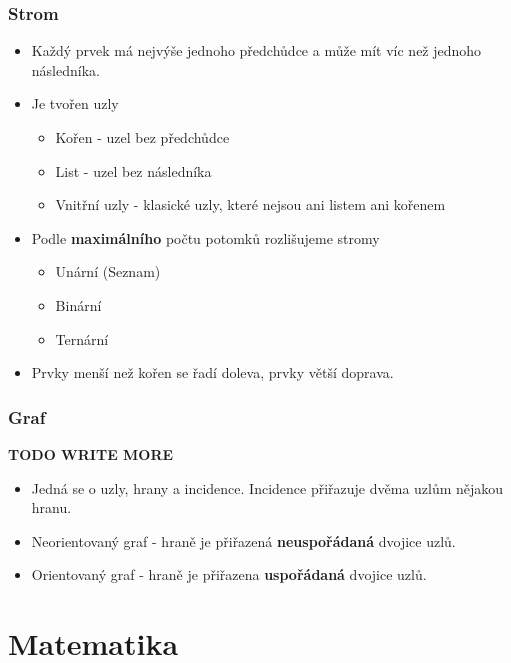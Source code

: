 \documentclass[10pt,a4paper]{article}
\begin{document}
\subsubsection{Strom}
\begin{itemize}
\item Každý prvek má nejvýše jednoho předchůdce a může mít víc než jednoho následníka.
\item Je tvořen uzly
\begin{itemize}
\item Kořen - uzel bez předchůdce
\item List - uzel bez následníka
\item Vnitřní uzly - klasické uzly, které nejsou ani listem ani kořenem
\end{itemize}
\item Podle \textbf{maximálního} počtu potomků rozlišujeme stromy
\begin{itemize}
\item Unární (Seznam)
\item Binární
\item Ternární
\end{itemize}
\item Prvky menší než kořen se řadí doleva, prvky větší doprava.
\end{itemize}

\subsubsection{Graf}
\textbf{TODO WRITE MORE}

\begin{itemize}
\item Jedná se o uzly, hrany a incidence. Incidence přiřazuje dvěma uzlům nějakou hranu.
\item Neorientovaný graf - hraně je přiřazená \textbf{neuspořádaná} dvojice uzlů.
\item Orientovaný graf - hraně je přiřazena \textbf{uspořádaná} dvojice uzlů.
\end{itemize}
\newpage
\section{Matematika}
\end{document}
